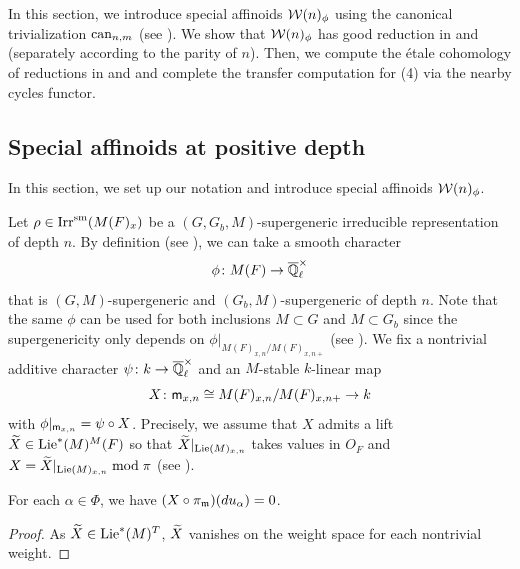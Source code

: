 \documentclass[12pt,reqno]{amsart}
\begin{document}
In this section, we introduce special affinoids ${\mathcal{W}}(n)_\phi$ using the canonical trivialization ${\operatorname{can}}_{n, m}$ (see ). We show that ${\mathcal{W}}(n)_\phi$ has good reduction in  and  (separately according to the parity of $n$). Then, we compute the \'{e}tale cohomology of reductions in  and  and complete the transfer computation for  (4) via the nearby cycles functor. 


\subsection{Special affinoids at positive depth} \label{ssec:special_affinoids_at_positive_depth}

In this section, we set up our notation and introduce special affinoids ${\mathcal{W}}(n)_\phi$. 

Let $\rho \in {\operatorname{Irr}}^{\operatorname{sm}}(M(F)_x)$ be a $(G, G_b, M)$-supergeneric irreducible representation of depth $n$. By definition (see ), we can take a smooth character
\[
    \phi \colon M(F) \to {\overline{\mathbb{Q}}_\ell^\times}
\]
that is $(G, M)$-supergeneric and $(G_b, M)$-supergeneric of depth $n$. Note that the same $\phi$ can be used for both inclusions $M \subset G$ and $M\subset G_b$ since the supergenericity only depends on $\phi \vert_{M(F)_{x, n} / M(F)_{x, n+}}$ (see \cite[Definition 3.1]{Tak26_Yu}). We fix a nontrivial additive character $\psi \colon k \to {\overline{\mathbb{Q}}_\ell^\times}$ and an $M$-stable $k$-linear map
\[
    X \colon {\mathsf{m}}_{x, n} \cong M(F)_{x, n} / M(F)_{x, n+} \to k
\]
with $\phi \vert_{{\mathsf{m}}_{x, n}} = \psi \circ X$. Precisely, we assume that $X$ admits a lift ${\widetilde{X}} \in {\operatorname{Lie}}^*(M)^M(F)$ so that ${\widetilde{X}}\vert_{{\operatorname{Lie}}(M)_{x, n}}$ takes values in $O_F$ and $X = {\widetilde{X}}\vert_{{\operatorname{Lie}}(M)_{x, n}} \bmod \pi$ (see \cite[Definition 4.1.1]{FS25}). 

\begin{lem} \label{lem:vanish_X}
    For each $\alpha \in \Phi$, we have $(X \circ \pi_{{\mathfrak{m}}})(du_\alpha) = 0$.  
\end{lem}
\begin{proof}
    As ${\widetilde{X}} \in {\operatorname{Lie}}^*(M)^T$, ${\widetilde{X}}$ vanishes on the weight space for each nontrivial weight.  
\end{proof}
\end{document}

